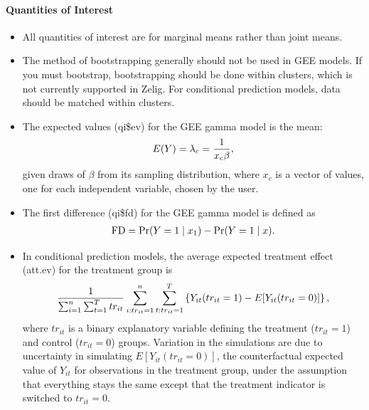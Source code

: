 \documentclass[letterpaper,10pt,english]{sphinxmanual}
\begin{document}
\paragraph{Quantities of Interest}
\label{zelig-gammagee:quantities-of-interest}\begin{itemize}
\item {} 
All quantities of interest are for marginal means rather than joint
means.

\item {} 
The method of bootstrapping generally should not be used in GEE
models. If you must bootstrap, bootstrapping should be done within
clusters, which is not currently supported in Zelig. For conditional
prediction models, data should be matched within clusters.

\item {} 
The expected values (qi\$ev) for the GEE gamma model is the mean:
\begin{gather}
\begin{split}E(Y) =
  \lambda_{c} = \frac{1}{x_c \beta},\end{split}\notag
\end{gather}
given draws of \(\beta\) from its sampling distribution, where
\(x_{c}\) is a vector of values, one for each independent
variable, chosen by the user.

\item {} 
The first difference (qi\$fd) for the GEE gamma model is defined as
\begin{gather}
\begin{split}\textrm{FD} = \Pr(Y = 1 \mid x_1) - \Pr(Y = 1 \mid x).\end{split}\notag
\end{gather}
\item {} 
In conditional prediction models, the average expected treatment
effect (att.ev) for the treatment group is
\begin{gather}
\begin{split}\frac{1}{\sum_{i=1}^n \sum_{t=1}^T tr_{it}}\sum_{i:tr_{it}=1}^n \sum_{t:tr_{it}=1}^T \left\{ Y_{it}(tr_{it}=1) -
      E[Y_{it}(tr_{it}=0)] \right\},\end{split}\notag
\end{gather}
where \(tr_{it}\) is a binary explanatory variable defining the
treatment (\(tr_{it}=1\)) and control (\(tr_{it}=0\)) groups.
Variation in the simulations are due to uncertainty in simulating
\(E[Y_{it}(tr_{it}=0)]\), the counterfactual expected value of
\(Y_{it}\) for observations in the treatment group, under the
assumption that everything stays the same except that the treatment
indicator is switched to \(tr_{it}=0\).

\end{itemize}
\end{document}
